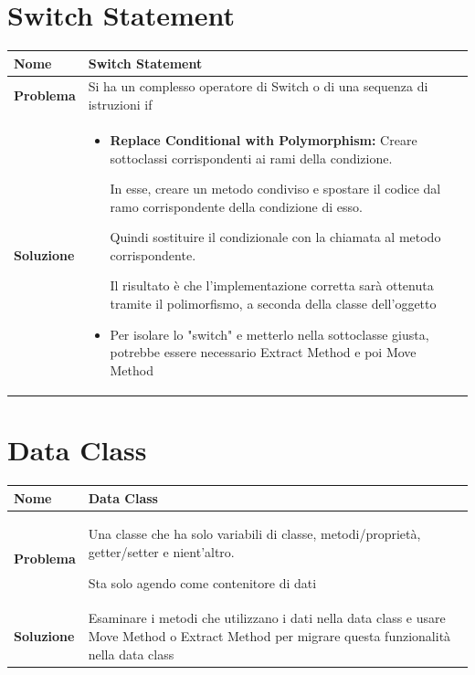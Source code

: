 \section{Switch Statement}
\begin{table}[h]
    \centering
    \renewcommand{\arraystretch}{1.2} %
    \begin{tabularx}{\textwidth}{l X}
        \toprule
        \textbf{Nome} & Switch Statement \\
        \midrule
        \textbf{Problema} & Si ha un complesso operatore di Switch o di una sequenza di istruzioni if \\
        \midrule
        \textbf{Soluzione} & 
        \begin{itemize}[leftmargin=*, nosep, after=\vspace{0.5em}]
           \item \textbf{Replace Conditional with Polymorphism:} Creare sottoclassi corrispondenti ai rami della condizione.

           In esse, creare un metodo condiviso e spostare il codice dal ramo corrispondente della condizione di esso.

           Quindi sostituire il condizionale con la chiamata al metodo corrispondente.

           Il risultato è che l'implementazione corretta sarà ottenuta tramite il polimorfismo, a seconda della classe dell'oggetto
           \item Per isolare lo "switch" e metterlo nella sottoclasse giusta, potrebbe essere necessario Extract Method e poi Move Method
        \end{itemize}
        \\ %
        \bottomrule
    \end{tabularx}
\end{table}

\section{Data Class}
\begin{table}[h]
    \centering
    \renewcommand{\arraystretch}{1.2} %
    \begin{tabularx}{\textwidth}{l X}
        \toprule
        \textbf{Nome} & Data Class \\
        \midrule
        \textbf{Problema} &
        Una classe che ha solo variabili di classe, metodi/proprietà, getter/setter e nient'altro.
        
        Sta solo agendo come contenitore di dati
        \\
        \midrule
        \textbf{Soluzione} & 
        Esaminare i metodi che utilizzano i dati nella data class e usare Move Method o Extract Method per migrare questa funzionalità nella data class
        \\ %
        \bottomrule
    \end{tabularx}
\end{table}
 \newpage
